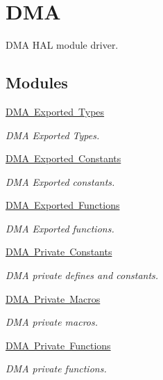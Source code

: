 \hypertarget{group___d_m_a}{}\section{D\+MA}
\label{group___d_m_a}


D\+MA H\+AL module driver.  


\subsection*{Modules}
\begin{DoxyCompactItemize}
\item 
\mbox{\hyperlink{group___d_m_a___exported___types}{D\+M\+A Exported Types}}
\begin{DoxyCompactList}\small\item\em D\+MA Exported Types. \end{DoxyCompactList}\item 
\mbox{\hyperlink{group___d_m_a___exported___constants}{D\+M\+A Exported Constants}}
\begin{DoxyCompactList}\small\item\em D\+MA Exported constants. \end{DoxyCompactList}\item 
\mbox{\hyperlink{group___d_m_a___exported___functions}{D\+M\+A Exported Functions}}
\begin{DoxyCompactList}\small\item\em D\+MA Exported functions. \end{DoxyCompactList}\item 
\mbox{\hyperlink{group___d_m_a___private___constants}{D\+M\+A Private Constants}}
\begin{DoxyCompactList}\small\item\em D\+MA private defines and constants. \end{DoxyCompactList}\item 
\mbox{\hyperlink{group___d_m_a___private___macros}{D\+M\+A Private Macros}}
\begin{DoxyCompactList}\small\item\em D\+MA private macros. \end{DoxyCompactList}\item 
\mbox{\hyperlink{group___d_m_a___private___functions}{D\+M\+A Private Functions}}
\begin{DoxyCompactList}\small\item\em D\+MA private functions. \end{DoxyCompactList}\end{DoxyCompactItemize}
